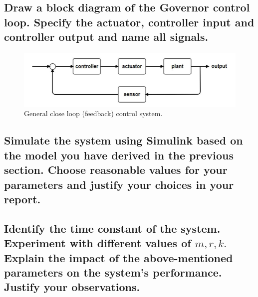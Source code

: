 \documentclass[11pt]{scrartcl} %
\begin{document}
\subsection{Draw a block diagram of the Governor control loop. Specify the actuator, controller input and controller output and name all signals.}
\begin{figure}[h] 
	\centering
	\includegraphics[width=0.8\columnwidth]{images/p5.JPG}
	\caption{General close loop (feedback) control system.}
\end{figure} \newpage



\subsection{Simulate the system using Simulink based on the model you have derived in the previous section. Choose reasonable values for your parameters and justify your choices in your report.}
\subsection{Identify the time constant of the system. Experiment with different values of $m, r, k .$ Explain the impact of the above-mentioned parameters on the system's performance. Justify your observations.}
\end{document}
